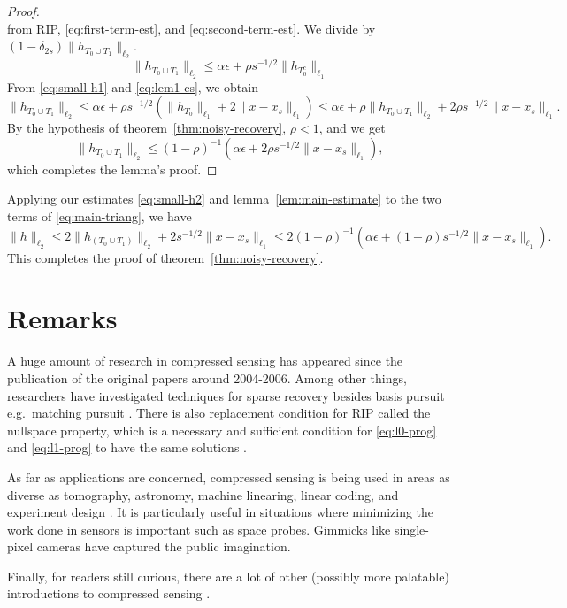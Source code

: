 \documentclass{article}
\theoremstyle{definition}
\begin{document}
\begin{proof}
$$$$
from RIP, \eqref{eq:first-term-est}, and \eqref{eq:second-term-est}. We divide by $(1 - \delta_{2s})\|h_{T_0\cup T_1}\|_{\ell_2}$.
$$
\|h_{T_0\cup T_1}\|_{\ell_2} \leq \alpha\epsilon + \rho s^{-1/2}\|h_{T_0^c}\|_{\ell_1}
$$
From \eqref{eq:small-h1} and \eqref{eq:lem1-cs}, we obtain
$$
\|h_{T_0 \cup T_1}\|_{\ell_2} \leq \alpha\epsilon + \rho s^{-1/2}(\|h_{T_0}\|_{\ell_1} + 2\|x - x_s\|_{\ell_1}) \leq \alpha\epsilon + \rho \|h_{T_0\cup T_1}\|_{\ell_2} + 2\rho s^{-1/2}\|x - x_s\|_{\ell_1}.
$$
By the hypothesis of theorem~\ref{thm:noisy-recovery}, $\rho < 1$, and we get
$$
\|h_{T_0\cup T_1}\|_{\ell_2} \leq (1 - \rho)^{-1}(\alpha\epsilon + 2\rho s^{-1/2}\|x - x_s\|_{\ell_1}),
$$
which completes the lemma's proof.
\end{proof}

Applying our estimates \eqref{eq:small-h2} and lemma~\ref{lem:main-estimate} to the two terms of \eqref{eq:main-triang}, we have
$$
\|h\|_{\ell_2} \leq 2\|h_{(T_0\cup T_1)}\|_{\ell_2} + 2s^{-1/2}\|x - x_s\|_{\ell_1} \leq 2(1 - \rho)^{-1}(\alpha\epsilon + (1 + \rho)s^{-1/2}\|x - x_s\|_{\ell_1}).
$$
This completes the proof of theorem~\ref{thm:noisy-recovery}.

\section{Remarks}
A huge amount of research in compressed sensing has appeared since the publication of the original papers \cite{ctr-stable,donoho-cs} around 2004-2006. Among other things, researchers have investigated techniques for sparse recovery besides basis pursuit e.g.\ matching pursuit \cite{tg-matching}. There is also replacement condition for RIP called the nullspace property, which is a necessary and sufficient condition for \eqref{eq:l0-prog} and \eqref{eq:l1-prog} to have the same solutions \cite{nullspace}.

As far as applications are concerned, compressed sensing is being used in areas as diverse as tomography, astronomy, machine linearing, linear coding, and experiment design \cite{cs-science,dantzig-selector}. It is particularly useful in situations where minimizing the work done in sensors is important such as space probes. Gimmicks like single-pixel cameras \cite{single-pixel} have captured the public imagination.

Finally, for readers still curious, there are a lot of other (possibly more palatable) introductions to compressed sensing \cite{cw-intro,cs-book,foucart-intro,users-guide,kutyniok-cs,qaisar-compressive,romberg-intro}.



\end{document}
